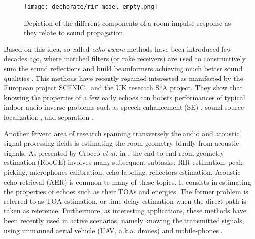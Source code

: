 \begin{figure}
    \centering
    \texttt{[image: dechorate/rir\_model\_empty.png]}
    \caption{Depiction of the different components of a room impulse response as they relate to sound propagation.}
    \label{fig:rir}
\end{figure}




Based on this idea, so-called \textit{echo-aware} methods have been introduced few decades ago, where matched filters (or rake receivers) are used to constructively sum the sound reflections \cite{Jan1995matched, Affes1997signal} and build beamformers achieving much better sound qualities \cite{Gannot2001signal}. This methods have recently regained interested as manifested by the European project SCENIC~\cite{Annibale2011scenic} and the UK research \href{http://www.s3a-spatialaudio.org/}{S$^3$A project}. They show that knowing the properties of a few early echoes can boosts performances of typical indoor audio inverse problems such as speech enhancement (SE) \cite{Dockmanic2015raking, Kowalczyk2019raking}, sound source localization \cite{Ribeiro2010turning, DiCarlo2019mirage}, and separation \cite{Scheibler2017separake, Leglaive2016multichannel}.

Another fervent area of research spanning transversely the audio and acoustic signal processing fields is estimating the room geometry blindly from acoustic signals. As presented by Crocco \textit{et al.} in \cite{Crocco2017uncalibrated}, the end-to-end room geometry estimation (RooGE) involves many subsequent subtasks: RIR estimation, peak picking, microphones calibration, echo labeling, reflectors estimation. Acoustic echo retrieval (AER) is common to many of these topics. It consists in estimating the properties of echoes such as their TOAs and energies. The former problem is referred to as TOA estimation, or time-delay estimation when the direct-path is taken as reference. Furthermore, as interesting applications, these methods have been recently used in active scenarios, namely knowing the transmitted signals, using unmanned aerial vehicle (UAV, a.k.a. drones) \cite{Jensen2019method, Boutin2020drone} and mobile-phones \cite{Shih2019phone}.

